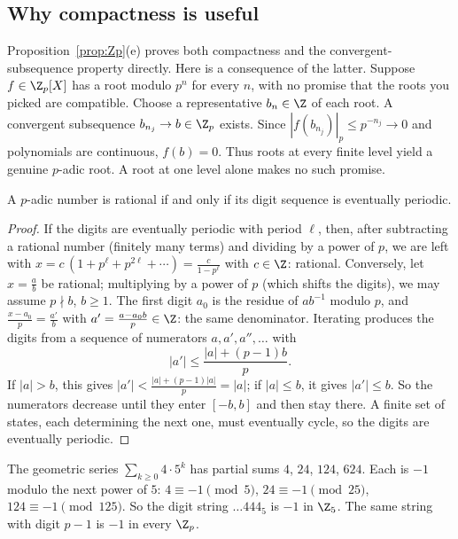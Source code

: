 \subsection*{Why compactness is useful}
Proposition~\ref{prop:Zp}(e) proves both compactness and the convergent-subsequence property directly. Here is a consequence of the latter.
Suppose $f\in\Z_p[X]$ has a root modulo $p^n$ for every $n$, with no promise
that the roots you picked are compatible. Choose a representative $b_n\in\Z$
of each root. A convergent subsequence $b_{n_j}\to b\in\Z_p$ exists. Since
$|f(b_{n_j})|_p\le p^{-n_j}\to0$ and polynomials are continuous, $f(b)=0$.
Thus roots at every finite level yield a genuine $p$-adic root. A root at
one level alone makes no such promise.

\begin{proposition}\label{prop:periodic}
A $p$-adic number is rational if and only if its digit sequence is eventually periodic.
\end{proposition}
\begin{proof}
If the digits are eventually periodic with period $\ell$, then, after subtracting a rational number (finitely many terms) and dividing by a power of $p$, we are left with $x=c\,(1+p^\ell+p^{2\ell}+\cdots)=\frac c{1-p^\ell}$ with $c\in\Z$: rational. Conversely, let $x=\frac ab$ be rational; multiplying by a power of $p$ (which shifts the digits), we may assume $p\nmid b$, $b\ge1$. The first digit $a_0$ is the residue of $ab^{-1}$ modulo $p$, and $\frac{x-a_0}p=\frac{a'}b$ with $a'=\frac{a-a_0b}p\in\Z$: the same denominator. Iterating produces the digits from a sequence of numerators $a,a',a'',\dots$ with
\[
|a'|\le\frac{|a|+(p-1)b}p.
\]
If $|a|>b$, this gives $|a'|<\frac{|a|+(p-1)|a|}p=|a|$; if $|a|\le b$, it gives $|a'|\le b$. So the numerators decrease until they enter $[-b,b]$ and then stay there. A finite set of states, each determining the next one, must eventually cycle, so the digits are eventually periodic.
\end{proof}

\begin{examplex}
The geometric series $\sum_{k\ge 0}4\cdot 5^k$ has partial sums $4$, $24$, $124$, $624$. Each is $-1$ modulo the next power of $5$: $4\equiv -1\pmod 5$, $24\equiv -1\pmod{25}$, $124\equiv -1\pmod{125}$. So the digit string $\ldots 444_5$ is $-1$ in $\Z_5$. The same string with digit $p-1$ is $-1$ in every $\Z_p$.
\end{examplex}

